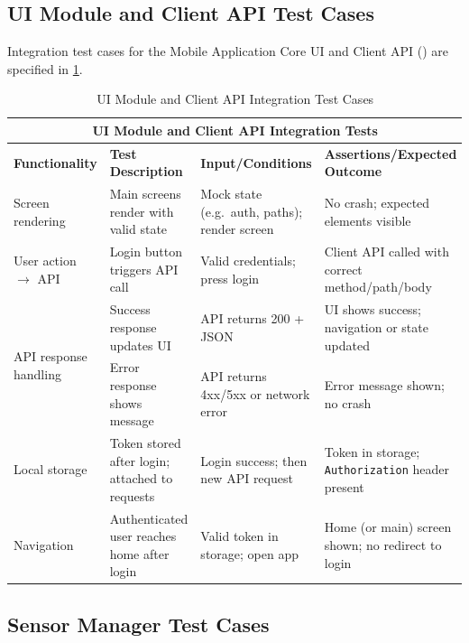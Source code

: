 \subsection{UI Module and Client API Test Cases}
\label{subsec:ui_module_client_api_test_cases}%

Integration test cases for the Mobile Application Core UI and Client API () are specified in \cref{tab:test_cases_ui_client_api}.

\begin{table}[ht]
\centering
\begin{tabular}{|p{3.2cm}|p{3.8cm}|p{3.2cm}|p{4.8cm}|}
\hline
\multicolumn{4}{|c|}{\textbf{UI Module and Client API Integration Tests}} \\ 
\hline
\textbf{Functionality} & \textbf{Test Description} & \textbf{Input/Conditions} & \textbf{Assertions/Expected Outcome} \\
\hline
Screen rendering
 & Main screens render with valid state
 & Mock state (e.g.\ auth, paths); render screen
 & No crash; expected elements visible \\ \hline
User action $\to$ API
 & Login button triggers API call
 & Valid credentials; press login
 & Client API called with correct method/path/body \\ \hline
\multirow{2}{*}{API response handling}
 & Success response updates UI
 & API returns 200 + JSON
 & UI shows success; navigation or state updated \\ \cline{2-4}
 & Error response shows message
 & API returns 4xx/5xx or network error
 & Error message shown; no crash \\ \hline
Local storage
 & Token stored after login; attached to requests
 & Login success; then new API request
 & Token in storage; \texttt{Authorization} header present \\ \hline
Navigation
 & Authenticated user reaches home after login
 & Valid token in storage; open app
 & Home (or main) screen shown; no redirect to login \\ \hline
\end{tabular}
\caption{UI Module and Client API Integration Test Cases}
\label{tab:test_cases_ui_client_api}
\end{table}

\subsection{Sensor Manager Test Cases}
\label{subsec:sensor_manager_test_cases}%

